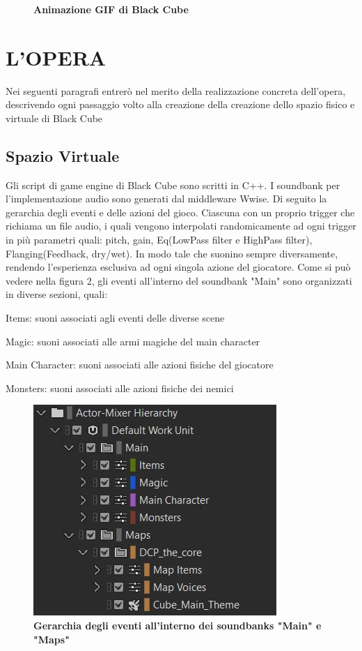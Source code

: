 	\begin{figure}
		\begin{center}
			\caption{\textbf{Animazione GIF di Black Cube}}
			\label{fig:gif}
		\end{center}
	\end{figure}

\section{L'OPERA}
Nei seguenti paragrafi entrerò nel merito della realizzazione concreta dell'opera, descrivendo ogni passaggio volto alla creazione della creazione dello spazio fisico e virtuale di Black Cube

	\subsection{Spazio Virtuale}
	Gli script di game engine di Black Cube sono scritti in C++. I soundbank per l'implementazione audio sono generati dal middleware Wwise. Di seguito la gerarchia degli eventi e delle azioni del gioco. Ciascuna con un proprio trigger che richiama un file audio, i quali vengono interpolati randomicamente ad ogni trigger in più parametri quali: pitch, gain, Eq(LowPass filter e HighPass filter), Flanging(Feedback, dry/wet). In modo tale che suonino sempre diversamente, rendendo l'esperienza esclusiva ad ogni singola azione del giocatore.
	Come si può vedere nella figura 2, gli eventi all'interno del soundbank "Main" sono organizzati in diverse sezioni, quali:
	\begin{compactitem}
		\item Items: suoni associati agli eventi delle diverse scene
		\item Magic: suoni associati alle armi magiche del main character
		\item Main Character: suoni associati alle azioni fisiche del giocatore
		\item Monsters: suoni associati alle azioni fisiche dei nemici
	\end{compactitem}
	
	\begin{figure}[h]
		\begin{center}
			\includegraphics[width=.47\textwidth]{img/image2.jpg}
			\caption{\textbf{Gerarchia degli eventi all'interno dei soundbanks "Main" e "Maps"}}
			\label{gr01}
		\end{center}
	\end{figure}

